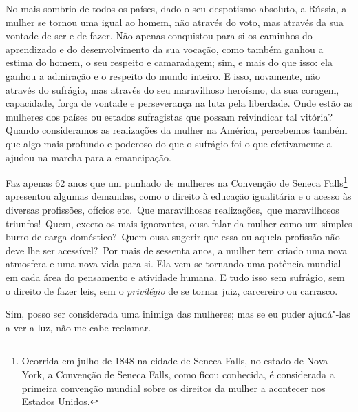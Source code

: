 No mais sombrio de todos os países, dado o seu despotismo absoluto, a
Rússia, a mulher se tornou uma igual ao homem, não através do voto, mas
através da sua vontade de ser e de fazer. Não apenas conquistou para
si os caminhos do aprendizado e do desenvolvimento da sua vocação,
como também ganhou a estima do homem, o seu respeito e camaradagem; sim, e
mais do que isso: ela ganhou a admiração e o respeito do mundo inteiro.
E isso, novamente, não através do sufrágio, mas através do seu
maravilhoso heroísmo, da sua coragem, capacidade, força de vontade e
perseverança na luta pela liberdade. Onde estão as mulheres dos países
ou estados sufragistas que possam reivindicar tal vitória? Quando
consideramos as realizações da mulher na América, percebemos também que
algo mais profundo e poderoso do que o sufrágio foi o que efetivamente a
ajudou na marcha para a emancipação.

Faz apenas 62 anos que um punhado de mulheres na Convenção
de Seneca Falls\footnote{Ocorrida em julho de 1848 na cidade de Seneca Falls, no estado de Nova York, a Convenção de Seneca Falls, como ficou conhecida, é considerada a primeira convenção mundial sobre os direitos da mulher a acontecer nos Estados Unidos.} apresentou algumas demandas, como o direito à educação igualitária e o acesso às diversas
profissões, ofícios etc.~Que maravilhosas realizações,~que maravilhosos
triunfos!~Quem, exceto os mais ignorantes, ousa falar da mulher como um
simples burro de carga doméstico?~Quem ousa sugerir que essa ou aquela
profissão não deve lhe ser acessível?~Por mais de sessenta anos, a
mulher tem criado uma nova atmosfera e uma nova vida para si. Ela vem se
tornando uma potência mundial em cada área do pensamento e atividade
humana. E tudo isso sem sufrágio, sem o direito de fazer leis, sem o
\textit{privilégio} de se tornar juiz, carcereiro ou carrasco.

Sim, posso ser considerada uma inimiga das mulheres; mas se eu puder
ajudá"-las a ver a luz, não me cabe reclamar.

